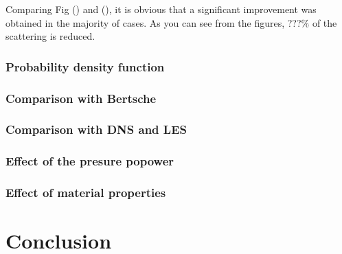 \documentclass[12pt,oneside]{jbook}
\begin{document}
Comparing Fig () and (), it is obvious that a significant improvement was obtained in the majority of cases.
As you can see from the figures, ???$\%$ of the scattering is reduced.


\subsection{Probability density function}


\subsection{Comparison with Bertsche}
\subsection{Comparison with DNS and LES}
\subsection{Effect of the presure popower}
\subsection{Effect of material properties}

\chapter{Conclusion}


\appendix
%



\end{document}
